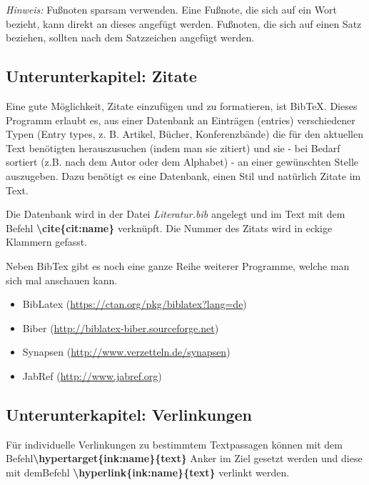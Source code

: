 \textit{Hinweis:} Fußnoten sparsam verwenden. Eine Fußnote, die sich auf ein Wort bezieht, kann direkt an dieses angefügt werden. Fußnoten, die sich auf einen Satz beziehen, sollten nach dem Satzzeichen angefügt werden.


\newpage
\subsection{Unterunterkapitel: Zitate}
\glqq Eine gute Möglichkeit, Zitate einzufügen und zu formatieren, ist BibTeX. Dieses Programm erlaubt es, aus einer Datenbank an Einträgen (entries) verschiedener Typen (Entry types, z. B. Artikel, Bücher, Konferenzbände) die für den aktuellen Text benötigten herauszusuchen (indem man sie zitiert) und sie - bei Bedarf sortiert (z.B. nach dem Autor oder dem Alphabet) - an einer gewünschten Stelle auszugeben. Dazu benötigt es eine Datenbank, einen Stil und natürlich Zitate im Text.\grqq \cite{2016:Zitieren}

Die Datenbank wird in der Datei \textit{Literatur.bib} angelegt und im Text mit dem Befehl \textbf{\textbackslash cite\{cit:name\}} verknüpft. Die Nummer des Zitats wird in eckige Klammern gefasst.



Neben BibTex gibt es noch eine ganze Reihe weiterer Programme, welche man sich mal anschauen kann.
\begin{itemize}
    \item BibLatex (\url{https://ctan.org/pkg/biblatex?lang=de})
    \item Biber (\url{http://biblatex-biber.sourceforge.net})
    \item Synapsen (\url{http://www.verzetteln.de/synapsen})
    \item JabRef (\url{http://www.jabref.org})
\end{itemize}


\newpage
\subsection{Unterunterkapitel: Verlinkungen}
Für individuelle Verlinkungen zu bestimmtem Textpassagen können mit dem Befehl\linebreak \textbf{\textbackslash hypertarget\{ink:name\}\{text\}} Anker im Ziel gesetzt werden und diese mit dem\linebreak Befehl \textbf{\textbackslash hyperlink\{ink:name\}\{text\}} verlinkt werden.

